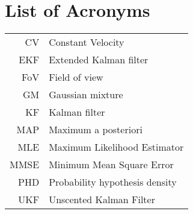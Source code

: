 \chapter{List of Acronyms}

\begin{tabular}{rl}
CV & Constant Velocity \\
EKF & Extended Kalman filter \\
FoV & Field of view \\
GM & Gaussian mixture \\
KF & Kalman filter \\
MAP & Maximum a posteriori \\
MLE & Maximum Likelihood Estimator \\
MMSE & Minimum Mean Square Error \\
PHD & Probability hypothesis density \\
UKF & Unscented Kalman Filter \\
\end{tabular}
